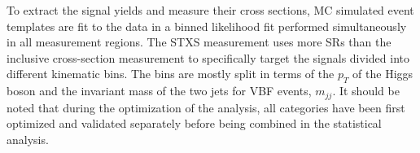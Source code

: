To extract the signal yields and measure their cross sections, MC simulated event templates are fit to the data in a binned likelihood fit performed simultaneously in all measurement regions.
The STXS measurement uses more SRs than the inclusive cross-section measurement to specifically target the signals divided into different kinematic bins. The bins are mostly split in terms of the $p_T$ of the Higgs boson and the invariant mass of the two jets for VBF events, $m_{jj}$. 
It should be noted that during the optimization of the analysis, all categories have been first optimized and validated separately before being combined in the statistical analysis.


